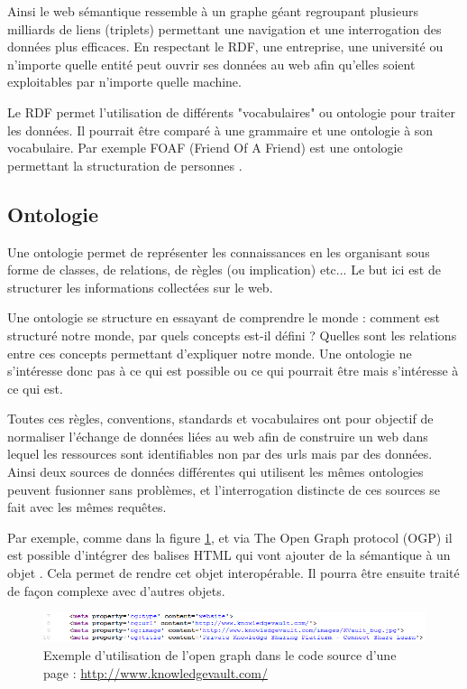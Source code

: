 Ainsi le web sémantique ressemble à un graphe géant regroupant plusieurs milliards de liens (triplets) permettant une navigation et une interrogation des données plus efficaces. En respectant le RDF, une entreprise, une université ou n'importe quelle entité peut ouvrir ses données au web afin qu'elles soient exploitables par n'importe quelle machine.

Le RDF permet l'utilisation de différents "vocabulaires" ou ontologie pour traiter les données. Il pourrait être comparé à une grammaire et une ontologie à son vocabulaire. Par exemple FOAF (Friend Of A Friend) est une ontologie permettant la structuration de personnes \cite{foaf}.

\subsection{Ontologie}

Une ontologie permet de représenter les connaissances en les organisant sous forme de classes, de relations, de règles (ou implication) etc... Le but ici est de structurer les informations collectées sur le web.

Une ontologie se structure en essayant de comprendre le monde : comment est structuré notre monde, par quels concepts est-il défini ? Quelles sont les relations entre ces concepts permettant d'expliquer notre monde. Une ontologie ne s'intéresse donc pas à ce qui est possible ou ce qui pourrait être mais s'intéresse à ce qui est. \cite{shirky} \cite{schema}

Toutes ces règles, conventions, standards et vocabulaires ont pour objectif de normaliser l'échange de données liées au web afin de construire un web dans lequel les ressources sont identifiables non par des urls mais par des données. Ainsi deux sources de données différentes qui utilisent les mêmes ontologies peuvent fusionner sans problèmes, et l'interrogation distincte de ces sources se fait avec les mêmes requêtes.

Par exemple, comme dans la figure \ref{fig1}, et via The Open Graph protocol (OGP) il est possible d'intégrer des balises HTML qui vont ajouter de la sémantique à un objet \cite{ogp}. Cela permet de rendre cet objet interopérable. Il pourra être ensuite traité de façon complexe avec d'autres objets.

\begin{figure}[ht]
\centering
\includegraphics[width=\textwidth, draft=false]{imgs/og_example.PNG}
\caption{Exemple d'utilisation de l'open graph dans le code source d'une page : \url{http://www.knowledgevault.com/}}
\label{fig1}
\end{figure}

